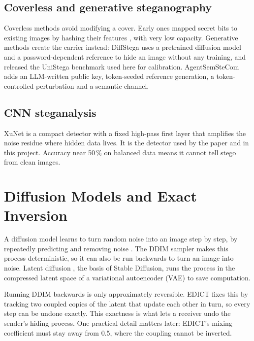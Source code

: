 \subsection{Coverless and generative steganography}
Coverless methods avoid modifying a cover. Early ones mapped secret bits to existing images by
hashing their features \cite{zhou2015coverless}, with very low capacity. Generative methods
create the carrier instead: DiffStega \cite{yang2024diffstega} uses a pretrained diffusion model
and a password-dependent reference to hide an image without any training, and released the
UniStega benchmark used here for calibration. AgentSemSteCom adds an LLM-written public key,
token-seeded reference generation, a token-controlled perturbation and a semantic channel.

\subsection{CNN steganalysis}
XuNet \cite{xu2016xunet} is a compact detector with a fixed high-pass first layer that amplifies
the noise residue where hidden data lives. It is the detector used by the paper and in this
project. Accuracy near 50\,\% on balanced data means it cannot tell stego from clean images.

\section{Diffusion Models and Exact Inversion}
A diffusion model learns to turn random noise into an image step by step, by repeatedly
predicting and removing noise \cite{ho2020ddpm}. The DDIM sampler \cite{song2021ddim} makes this
process deterministic, so it can also be run backwards to turn an image into noise. Latent
diffusion \cite{rombach2022ldm}, the basis of Stable Diffusion, runs the process in the
compressed latent space of a variational autoencoder (VAE) to save computation.

Running DDIM backwards is only approximately reversible. EDICT \cite{wallace2023edict} fixes
this by tracking two coupled copies of the latent that update each other in turn, so every step
can be undone exactly. This exactness is what lets a receiver undo the sender's hiding process.
One practical detail matters later: EDICT's mixing coefficient must stay away from 0.5, where
the coupling cannot be inverted.

